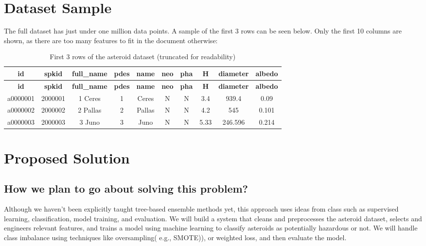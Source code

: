 \documentclass[12pt]{article}
\begin{document}
\section{Dataset Sample}
The full dataset has just under one million data points.
A sample of the first 3 rows can be seen below.
Only the first 10 columns are shown, as there are too many features to fit in the document otherwise:

\begin{scriptsize}
\begin{longtable}{|c|c|c|c|c|c|c|c|c|c|}
\caption{First 3 rows of the asteroid dataset (truncated for readability)} \\
\hline
\textbf{id} & \textbf{spkid} & \textbf{full\_name} & \textbf{pdes} & \textbf{name} & \textbf{neo} & \textbf{pha} & \textbf{H} & \textbf{diameter} & \textbf{albedo} \\
\hline
\endfirsthead
\hline
\textbf{id} & \textbf{spkid} & \textbf{full\_name} & \textbf{pdes} & \textbf{name} & \textbf{neo} & \textbf{pha} & \textbf{H} & \textbf{diameter} & \textbf{albedo} \\
\hline
\endhead
a0000001 & 2000001 & 1 Ceres & 1 & Ceres & N & N & 3.4 & 939.4 & 0.09 \\
\hline
a0000002 & 2000002 & 2 Pallas & 2 & Pallas & N & N & 4.2 & 545 & 0.101 \\
\hline
a0000003 & 2000003 & 3 Juno & 3 & Juno & N & N & 5.33 & 246.596 & 0.214 \\
\hline
\end{longtable}
\end{scriptsize}
\section{Proposed Solution}

\subsection*{How we plan to go about solving this problem?}
\medskip
Although we haven’t been explicitly taught tree-based ensemble methods yet,
this approach uses ideas from class such as supervised learning, classification,
model training, and evaluation. We will build a system that
cleans and preprocesses the asteroid dataset, selects and engineers relevant
features, and trains a model using machine learning to classify asteroids as potentially hazardous
or not. We will handle class imbalance using techniques like oversampling( e.g., SMOTE)),
or weighted loss, and then evaluate the model.
\end{document}
